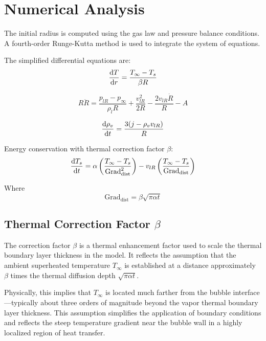 \documentclass[aps,pre,twocolumn,superscriptaddress,floatfix]{revtex4-2}
\begin{document}
\section{Numerical Analysis}

The initial radius is computed using the gas law and pressure balance conditions. A fourth-order Runge-Kutta method is used to integrate the system of equations.

The simplified differential equations are:
\begin{equation}
\dv{T}{r} = \frac{T_{\infty} - T_s}{\beta R}
\end{equation}

\begin{equation}
R \ddot{R} = \frac{p_{lR} - p_{\infty}}{\rho_l R} + \frac{v_{lR}^2}{2R} - \frac{2 v_{lR} \dot{R}}{R} - A
\end{equation}

\begin{equation}
\dv{\rho_v}{t} = \frac{3(j - \rho_v v_{lR})}{R}
\end{equation}

Energy conservation with thermal correction factor $\beta$:
\begin{equation}
\dv{T_s}{t} = \alpha \left(\frac{T_{\infty} - T_s}{\text{Grad}_{\text{dist}}^2}\right) - v_{lR} \left(\frac{T_{\infty} - T_s}{\text{Grad}_{\text{dist}}}\right)
\end{equation}

Where
\begin{equation}
\text{Grad}_{\text{dist}} = \beta \sqrt{\pi \alpha t}
\end{equation}


\subsection{Thermal Correction Factor $\beta$}

The correction factor $\beta$ is a thermal enhancement factor used to scale the thermal boundary layer thickness in the model. It reflects the assumption that the ambient superheated temperature $T_{\infty}$ is established at a distance approximately $\beta$ times the thermal diffusion depth $\sqrt{\pi \alpha t}$.

Physically, this implies that $T_{\infty}$ is located much farther from the bubble interface---typically about three orders of magnitude beyond the vapor thermal boundary layer thickness. This assumption simplifies the application of boundary conditions and reflects the steep temperature gradient near the bubble wall in a highly localized region of heat transfer.
\end{document}
